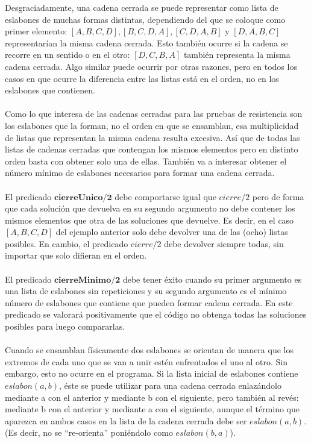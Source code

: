 \documentclass[11pt, a4paper]{article}
\begin{document}
Desgraciadamente, una cadena cerrada se puede representar como lista de eslabones de muchas formas distintas, dependiendo del que se coloque como primer elemento: $[A,B,C,D], [B,C,D,A], [C,D,A,B]$ y $[D,A,B,C]$ representarían la misma cadena cerrada. Esto también ocurre si la cadena se recorre en un sentido o en el otro: $[D,C,B,A]$ también representa la misma cadena cerrada. Algo similar puede ocurrir por otras razones, pero en todos los casos en que ocurre la diferencia entre las listas está en el orden, no en los eslabones que contienen.\\\\
Como lo que interesa de las cadenas cerradas para las pruebas de resistencia son los eslabones que la forman, no el orden en que se ensamblan, esa multiplicidad de listas que representan la misma cadena resulta excesiva. Así que de todas las listas de cadenas cerradas que contengan los mismos elementos pero en distinto orden basta con obtener solo una de ellas. También va a interesar obtener el número mínimo de eslabones necesarios para formar una cadena cerrada.\\\\
El predicado $\textbf{cierreUnico/2}$ debe comportarse igual que $cierre/2$ pero de forma que cada solución que devuelva en su segundo argumento no debe contener los mismos elementos que otra de las soluciones que devuelve. Es decir, en el caso $[A,B,C,D]$ del ejemplo anterior solo debe devolver una de las (ocho) listas posibles. En cambio, el predicado $cierre/2$ debe devolver siempre todas, sin importar que solo difieran en el orden.\\\\
El predicado $\textbf{cierreMinimo/2}$ debe tener éxito cuando su primer argumento es una lista de eslabones sin repeticiones y su segundo argumento es el mínimo número de eslabones que contiene que pueden formar cadena cerrada. En este predicado se valorará positivamente que el código no obtenga todas las soluciones posibles para luego compararlas.\\\\
Cuando se ensamblan físicamente dos eslabones se orientan de manera que los extremos de cada uno que se van a unir estén enfrentados el uno al otro. Sin embargo, esto no ocurre en el programa. Si la lista inicial de eslabones contiene $eslabon(a,b)$, éste se puede utilizar para una cadena cerrada enlazándolo mediante a con el anterior y mediante b con el siguiente, pero también al revés: mediante b con el anterior y mediante a con el siguiente, aunque el término que aparezca en ambos casos en la lista de la cadena cerrada debe ser $eslabon(a,b)$. (Es decir, no se “re-orienta” poniéndolo como $eslabon(b,a)$).\\\\
\end{document}
